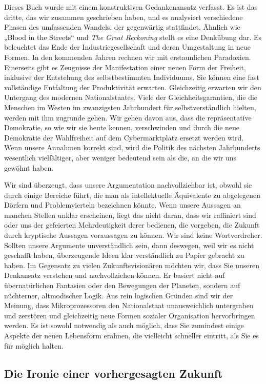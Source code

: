 \documentclass[
  a5paper,
  smalldemyvopaper,10pt,twoside,onecolumn,openright,extrafontsizes,hidelinks]{memoir}
\begin{document}
Dieses Buch wurde mit einem konstruktiven Gedankenansatz verfasst. Es
ist das dritte, das wir zusammen geschrieben haben, und es analysiert
verschiedene Phasen des umfassenden Wandels, der gegenwärtig
stattfindet. Ähnlich wie „Blood in the Streets`` und \emph{The Great
Reckoning} stellt es eine Denkübung dar. Es beleuchtet das Ende der
Industriegesellschaft und deren Umgestaltung in neue Formen. In den
kommenden Jahren rechnen wir mit erstaunlichen Paradoxien. Einerseits
gibt es Zeugnisse der Manifestation einer neuen Form der Freiheit,
inklusive der Entstehung des selbstbestimmten Individuums. Sie können
eine fast vollständige Entfaltung der Produktivität erwarten.
Gleichzeitig erwarten wir den Untergang des modernen Nationalstaates.
Viele der Gleichheitsgarantien, die die Menschen im Westen im
zwanzigsten Jahrhundert für selbstverständlich hielten, werden mit ihm
zugrunde gehen. Wir gehen davon aus, dass die repräsentative Demokratie,
so wie wir sie heute kennen, verschwinden und durch die neue Demokratie
der Wahlfreiheit auf dem Cybermarktplatz ersetzt werden wird. Wenn
unsere Annahmen korrekt sind, wird die Politik des nächsten Jahrhunderts
wesentlich vielfältiger, aber weniger bedeutend sein als die, an die wir
uns gewöhnt haben.

Wir sind überzeugt, dass unsere Argumentation nachvollziehbar ist,
obwohl sie durch einige Bereiche führt, die man als intellektuelle
Äquivalente zu abgelegenen Dörfern und Problemvierteln bezeichnen
könnte. Wenn unsere Aussagen an manchen Stellen unklar erscheinen, liegt
das nicht daran, dass wir raffiniert sind oder uns der gefeierten
Mehrdeutigkeit derer bedienen, die vorgeben, die Zukunft durch
kryptische Aussagen voraussagen zu können. Wir sind keine Wortverdreher.
Sollten unsere Argumente unverständlich sein, dann deswegen, weil wir es
nicht geschafft haben, überzeugende Ideen klar verständlich zu Papier
gebracht zu haben. Im Gegensatz zu vielen Zukunftsvisionären möchten
wir, dass Sie unseren Denkansatz verstehen und nachvollziehen können. Er
basiert nicht auf übernatürlichen Fantasien oder den Bewegungen der
Planeten, sondern auf nüchterner, altmodischer Logik. Aus rein logischen
Gründen sind wir der Meinung, dass Mikroprozessoren den Nationalstaat
unausweichlich untergraben und zerstören und gleichzeitig neue Formen
sozialer Organisation hervorbringen werden. Es ist sowohl notwendig als
auch möglich, dass Sie zumindest einige Aspekte der neuen Lebensform
erahnen, die vielleicht schneller eintritt, als Sie es für möglich
halten.

\subsection{Die Ironie einer vorhergesagten
Zukunft}\label{die-ironie-einer-vorhergesagten-zukunft}
\end{document}
